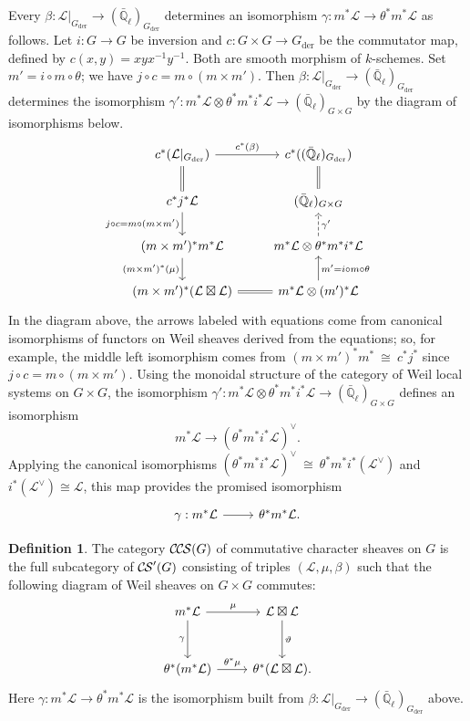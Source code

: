 \documentclass[10pt]{amsart}
\theoremstyle{plain}
\theoremstyle{definition}
\newtheorem{definition}[theorem]{Definition}
\newcommand{\EE}{\mathbb{\bar Q}_\ell}
\newcommand{\Fq}{k}
\newcommand{\der}{_{\operatorname{der}}}
\newcommand{\iso}{{\ \cong\ }}
\newcommand{\cs}[1]{{\mathcal{#1}}}
\newcommand{\CS}{{\mathcal{C\hskip-0.8pt S}}}
\newcommand{\CCS}{{\mathcal{C\hskip-.8pt C\hskip-0.8pt S}}}
\begin{document}
Every $\beta : \cs{L}\vert_{G\der} \to (\EE)_{G\der}$ determines an isomorphism $\gamma : m^*\cs{L} \to \theta^*m^*\cs{L}$ as follows.
Let $i : G \to G$ be inversion and $c : G\times G\to G\der$ be the commutator map, defined by $c(x,y)= xyx^{-1}y^{-1}$.
Both are smooth morphism of $\Fq$-schemes.
Set $m' = i \circ m \circ \theta$; we have $j\circ c = m \circ (m \times m')$.
Then $\beta : \cs{L}\vert_{G\der} \to (\EE)_{G\der}$ determines the isomorphism $\gamma' : m^*\cs{L} \otimes \theta^* m^* i^*\cs{L} \to (\EE)_{G\times G}$ by the diagram of isomorphisms below.
\begin{equation}
\begin{tikzcd}
\arrow[equal]{d} c^* (\cs{L}\vert_{G\der}) \arrow{r}{c^*(\beta)} 
	&  c^*((\EE)_{G\der}) \arrow[equal]{d} \\
\arrow{d}[swap]{j\circ c = m \circ (m \times m')} c^* j^* \cs{L} 
	&   (\EE)_{G\times G} \\
(m \times m')^* m^* \cs{L} \arrow{d}[swap]{(m \times m')^*(\mu)} 
	&  m^*\cs{L} \otimes \theta^* m^* i^* \cs{L}  \arrow[dashed]{u}[swap]{\gamma'} \\
(m \times m')^* (\cs{L} \boxtimes \cs{L}) \arrow[equal]{r} 
	& m^*\cs{L} \otimes (m')^*\cs{L} \arrow{u}[swap]{m' = i\circ m\circ \theta} 
\end{tikzcd}
\end{equation}
In the diagram above, the arrows labeled with equations come from canonical isomorphisms of functors on Weil sheaves derived from the equations; so, for example, the middle left isomorphism comes from $(m\times m')^* m^* \iso c^* j^*$ since $j\circ c = m \circ (m \times m')$.
Using the monoidal structure of the category of Weil local systems on $G\times G$, the isomorphism $\gamma' : m^*\cs{L} \otimes \theta^* m^* i^*\cs{L} \to (\EE)_{G\times G}$ defines an isomorphism
\[
m^*\cs{L} \to (\theta^* m^* i^*\cs{L})^\vee.
\]
Applying the canonical isomorphisms $(\theta^* m^* i^*\cs{L})^\vee \iso \theta^* m^* i^* (\cs{L}^\vee)$ and $i^*(\cs{L}^\vee) \cong \cs{L}$, this map provides the promised isomorphism
\[
\begin{tikzcd}
\gamma : m^*\cs{L} \arrow{r} & \theta^* m^* \cs{L}.
\end{tikzcd}
\]

\begin{definition}\label{def:CCS}
The category $\CCS(G)$ of commutative character sheaves on $G$ is the full subcategory of $\CS'(G)$ consisting of triples $(\cs{L},\mu,\beta)$ such that the following diagram of Weil sheaves on $G \times G$ commutes:
  \[
  \begin{tikzcd}[row sep=30]
   m^*\cs{L} \arrow{d}[swap]{\gamma} \arrow{r}{\mu} & \cs{L}\boxtimes\cs{L} \arrow{d}{\vartheta}\\
   \theta^*(m^*\cs{L}) \arrow{r}{{\theta}^*\mu} &  \theta^*(\cs{L}\boxtimes\cs{L}).
  \end{tikzcd}
  \]
Here $\gamma : m^*\cs{L} \to \theta^* m^* \cs{L}$ is the isomorphism built from $\beta : \cs{L}\vert_{G\der} \to (\EE)_{G\der}$ above. 
\end{definition}
\end{document}
